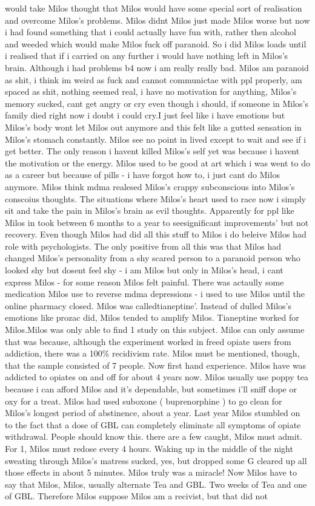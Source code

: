 \documentclass[12pt]{book}
\begin{document}
would take Milos thought that Milos would have some special sort of realisation and overcome Milos's problems. Milos didnt Milos just made Milos worse but now i had found something that i could actually have fun with, rather then alcohol and weeded which would make Milos fuck off paranoid. So i did Milos loads until i realised that if i carried on any further i would have nothing left in Milos's brain. Although i had problems b4 now i am really really bad. Milos am paranoid as shit, i think im weird as fuck and cannot communictae with ppl properly, am spaced as shit, nothing seemed real, i have no motivation for anything, Milos's memory sucked, cant get angry or cry even though i should, if someone in Milos's family died right now i doubt i could cry.I just feel like i have emotions but Milos's body wont let Milos out anymore and this felt like a gutted sensation in Milos's stomach constantly. Milos see no point in lived except to wait and see if i get better. The only reason i havent killed Milos's self yet was because i havent the motivation or the energy. Milos used to be good at art which i was went to do as a career but because of pills - i have forgot how to, i just cant do Milos anymore. Milos think mdma realesed Milos's crappy subconscious into Milos's conscoius thoughts. The situations where Milos's heart used to race now i simply sit and take the pain in Milos's brain as evil thoughts. Apparently for ppl like Milos in took between 6 months to a year to seesignificant improvements' but not recovery. Even though Milos had did all this stuff to Milos i do beleive Milos had role with psychologists. The only positive from all this was that Milos had changed Milos's personality from a shy scared person to a paranoid person who looked shy but dosent feel shy - i am Milos but only in Milos's head, i cant express Milos - for some reason Milos felt painful. There was actaully some medication Milos use to reverse mdma depressions - i used to use Milos until the online pharmacy closed. Milos was calledtianeptine'. Instead of dulled Milos's emotions like prozac did, Milos tended to amplify Milos. Tianeptine worked for Milos.Milos was only able to find 1 study on this subject. Milos can only assume that was because, although the experiment worked in freed opiate users from addiction, there was a 100\% recidivism rate. Milos must be mentioned, though, that the sample consisted of 7 people. Now first hand experience. Milos have was addicted to opiates on and off for about 4 years now. Milos usually use poppy tea because i can afford Milos and it's dependable, but sometimes i'll sniff dope or oxy for a treat. Milos had used suboxone ( buprenorphine ) to go clean for Milos's longest period of abstinence, about a year. Last year Milos stumbled on to the fact that a dose of GBL can completely eliminate all symptoms of opiate withdrawal. People should know this. there are a few caught, Milos must admit. For 1, Milos must redose every 4 hours. Waking up in the middle of the night sweating through Milos's matress sucked, yes, but dropped some G cleared up all those effects in about 5 minutes. Milos truly was a miracle! Now Milos have to say that Milos, Milos, usually alternate Tea and GBL. Two weeks of Tea and one of GBL. Therefore Milos suppose Milos am a recivist, but that did not 
\end{document}
